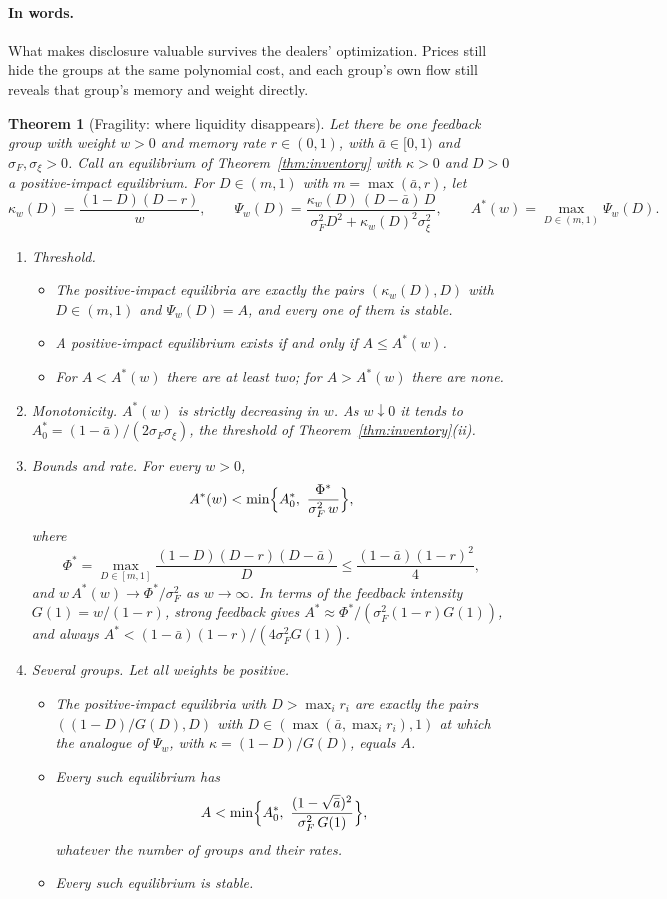 \documentclass[12pt]{article}
\newtheorem{theorem}{Theorem}[section]
\theoremstyle{definition}
\theoremstyle{remark}
\begin{document}
\paragraph{In words.} What makes disclosure valuable survives the dealers' optimization. Prices still hide the groups at the same polynomial cost, and each group's own flow still reveals that group's memory and weight directly.
\begin{theorem}[Fragility: where liquidity disappears]\label{thm:fragility}
Let there be one feedback group with weight $w>0$ and memory rate $r\in(0,1)$, with $\bar a\in[0,1)$ and $\sigma_F,\sigma_\xi>0$. Call an equilibrium of Theorem~\ref{thm:inventory} with $\kappa>0$ and $D>0$ a positive-impact equilibrium. For $D\in(m,1)$ with $m=\max(\bar a,r)$, let
\[
 \kappa_w(D)=\frac{(1-D)(D-r)}{w},\qquad \Psi_w(D)=\frac{\kappa_w(D)\,(D-\bar a)\,D}{\sigma_F^2D^2+\kappa_w(D)^2\sigma_\xi^2},\qquad A^*(w)=\max_{D\in(m,1)}\Psi_w(D).
\]
\begin{enumerate}[label=(\roman*),itemsep=1pt]
\item \emph{Threshold.}
 \begin{itemize}[itemsep=1pt,topsep=2pt]
 \item The positive-impact equilibria are exactly the pairs $(\kappa_w(D),D)$ with $D\in(m,1)$ and $\Psi_w(D)=A$, and every one of them is stable.
 \item A positive-impact equilibrium exists if and only if $A\le A^*(w)$.
 \item For $A<A^*(w)$ there are at least two; for $A>A^*(w)$ there are none.
 \end{itemize}
\item \emph{Monotonicity.} $A^*(w)$ is strictly decreasing in $w$. As $w\downarrow0$ it tends to $A^*_0=(1-\bar a)/(2\sigma_F\sigma_\xi)$, the threshold of Theorem~\ref{thm:inventory}(ii).
\item \emph{Bounds and rate.} For every $w>0$,
\[
 A^*(w)<\min\Bigl\{A^*_0,\ \frac{\Phi^*}{\sigma_F^2\,w}\Bigr\},
\]
 where
\[
 \Phi^*=\max_{D\in[m,1]}\frac{(1-D)(D-r)(D-\bar a)}{D}\le\frac{(1-\bar a)(1-r)^2}{4},
\]
 and $w\,A^*(w)\to\Phi^*/\sigma_F^2$ as $w\to\infty$. In terms of the feedback intensity $G(1)=w/(1-r)$, strong feedback gives $A^*\approx\Phi^*/(\sigma_F^2(1-r)G(1))$, and always $A^*<(1-\bar a)(1-r)/(4\sigma_F^2G(1))$.
\item \emph{Several groups.} Let all weights be positive.
 \begin{itemize}[itemsep=1pt,topsep=2pt]
 \item The positive-impact equilibria with $D>\max_ir_i$ are exactly the pairs $((1-D)/G(D),D)$ with $D\in(\max(\bar a,\max_ir_i),1)$ at which the analogue of $\Psi_w$, with $\kappa=(1-D)/G(D)$, equals $A$.
 \item Every such equilibrium has
 \[
  A<\min\Bigl\{A^*_0,\ \frac{(1-\sqrt{\bar a})^2}{\sigma_F^2\,G(1)}\Bigr\},
 \]
 whatever the number of groups and their rates.
 \item Every such equilibrium is stable.
 \end{itemize}
\end{enumerate}
\end{theorem}
\end{document}
